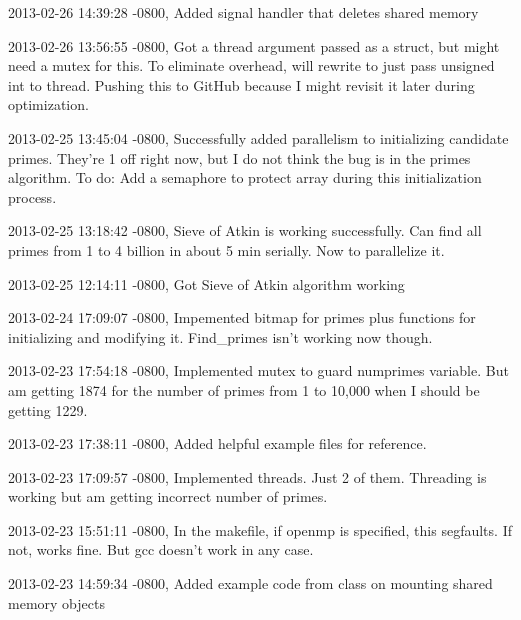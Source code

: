 \documentclass[letterpaper,10pt,titlepage]{article}
\begin{document}
\begin{enumerate}
2013-02-26 14:39:28 -0800, Added signal handler that deletes shared memory

2013-02-26 13:56:55 -0800, Got a thread argument passed as a struct, but might need a mutex for this. To eliminate overhead, will rewrite to just pass unsigned int to thread. Pushing this to GitHub because I might revisit it later during optimization.

2013-02-25 13:45:04 -0800, Successfully added parallelism to initializing candidate primes. They're 1 off right now, but I do not think the bug is in the primes algorithm. To do: Add a semaphore to protect array during this initialization process.

2013-02-25 13:18:42 -0800, Sieve of Atkin is working successfully. Can find all primes from 1 to 4 billion in about 5 min serially. Now to parallelize it.

2013-02-25 12:14:11 -0800, Got Sieve of Atkin algorithm working

2013-02-24 17:09:07 -0800, Impemented bitmap for primes plus functions for initializing and modifying it. Find\_primes isn't working now though.

2013-02-23 17:54:18 -0800, Implemented mutex to guard numprimes variable. But am getting 1874 for the number of primes from 1 to 10,000 when I should be getting 1229.

2013-02-23 17:38:11 -0800, Added helpful example files for reference.

2013-02-23 17:09:57 -0800, Implemented threads. Just 2 of them. Threading is working but am getting incorrect number of primes.

2013-02-23 15:51:11 -0800, In the makefile, if openmp is specified, this segfaults. If not, works fine. But gcc doesn't work in any case.

2013-02-23 14:59:34 -0800, Added example code from class on mounting shared memory objects


\end{enumerate}
\end{document}
